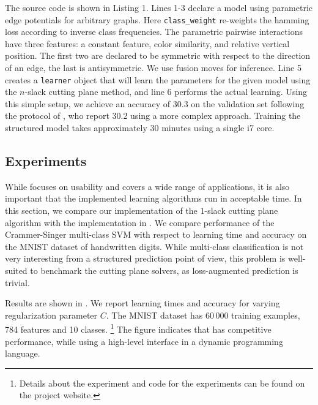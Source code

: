 The source code is shown in Listing 1.
Lines 1-3 declare a model using parametric edge potentials for arbitrary graphs.
Here \texttt{class\_weight} re-weights the hamming loss according to inverse class
frequencies. The parametric pairwise interactions have three features: a
constant feature, color similarity, and relative vertical position. The first two
are declared to be symmetric with respect to the direction of an edge, the last
is antisymmetric. We use fusion moves for inference.  Line 5
creates a \texttt{learner} object that will learn the parameters for the given
model using the $n$-slack cutting plane method, and line 6 performs the actual
learning.  Using this simple setup, we achieve an accuracy of 30.3 on the
validation set following the protocol of \citet{krahenbuhl2012efficient}, who
report 30.2 using a more complex approach. Training the structured model takes
approximately 30 minutes using a single i7 core.

\subsection{Experiments}\label{sec:benchmarks}
While \pystruct focuses on usability and covers a wide range of applications, it is also
important that the implemented learning algorithms run in acceptable time.
In this section, we compare our implementation of the $1$-slack cutting plane
algorithm with the implementation in \svmstruct.
We compare performance of the Crammer-Singer multi-class SVM with respect to
learning time and accuracy on the MNIST dataset of handwritten digits.
While multi-class classification is not very interesting from a structured
prediction point of view, this problem is well-suited to benchmark the cutting
plane solvers, as loss-augmented prediction is trivial.

Results are shown in . We report learning times and accuracy for
varying regularization parameter $C$. The MNIST dataset has 60\,000 training
examples, 784 features and 10 classes.%
\footnote{Details about the experiment and code for the experiments can be found on the project website.}
The figure indicates that \pystruct has competitive performance, while using
a high-level interface in a dynamic programming language.


